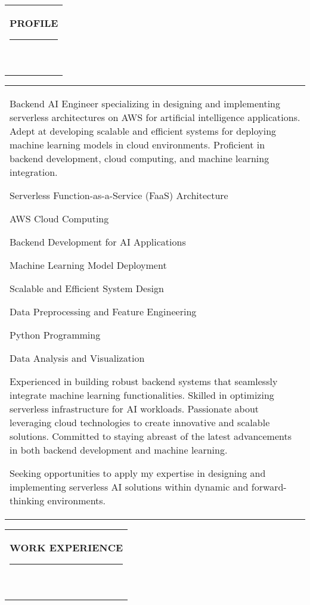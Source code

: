 \documentclass[10pt,A4]{article}
\newcommand{\mpwidth}{\linewidth-\fboxsep-\fboxsep}
\newcommand{\cvlist}[1] {
	\begin{itemize}{#1}\end{itemize}
}
\newcommand{\cvtext}[1] {
	\begin{tabular*}{1\mpwidth}{p{0.98\mpwidth}}
		\parbox{1\mpwidth}{#1}
	\end{tabular*}
}
\newcommand{\cvsection}[1] {
	\vspace{14pt}
	\cvtext{
		\textbf{\LARGE{\textcolor{darkcol}{\uppercase{#1}}}}\\[-4pt]
		\textcolor{maincol}{ \rule{0.1\textwidth}{2pt} } \\
	}
}
\begin{document}
\begin{paracol}{2}
\begin{rightcolumn}
\vfill\null
\cvsection{PROFILE}

\cvtext{
Backend AI Engineer specializing in designing and implementing serverless architectures on AWS for artificial intelligence applications. Adept at developing scalable and efficient systems for deploying machine learning models in cloud environments. Proficient in backend development, cloud computing, and machine learning integration.

\cvlist{
\item Serverless Function-as-a-Service (FaaS) Architecture
\item AWS Cloud Computing
\item Backend Development for AI Applications
\item Machine Learning Model Deployment
\item Scalable and Efficient System Design
\item Data Preprocessing and Feature Engineering
\item Python Programming
\item Data Analysis and Visualization
}

Experienced in building robust backend systems that seamlessly integrate machine learning functionalities. Skilled in optimizing serverless infrastructure for AI workloads. Passionate about leveraging cloud technologies to create innovative and scalable solutions. Committed to staying abreast of the latest advancements in both backend development and machine learning.

Seeking opportunities to apply my expertise in designing and implementing serverless AI solutions within dynamic and forward-thinking environments.
}



\cvsection{WORK EXPERIENCE}


\end{rightcolumn}
\end{paracol}
\end{document}
